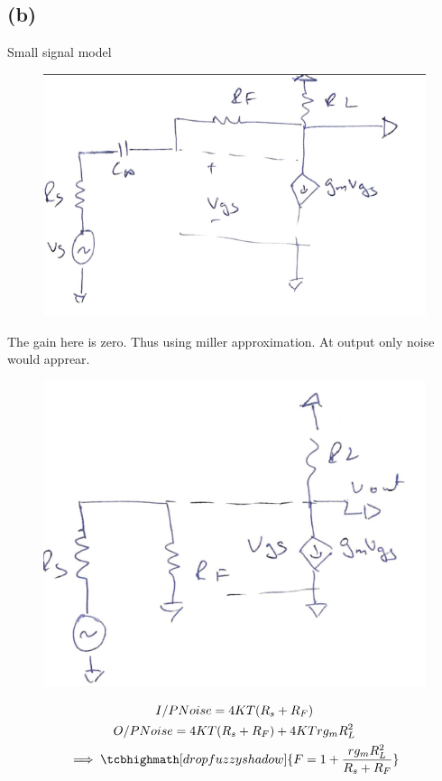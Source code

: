 \documentclass{article}
\begin{document}
\subsection*{(b)}
Small signal model
\begin{figure}[H]
	\centering
	\includegraphics[scale=0.4]{./figs/3c.png}
\end{figure}
The gain here is zero. Thus using miller approximation. At output only noise would apprear.
\begin{figure}[H]
	\centering
	\includegraphics[scale=0.4]{./figs/3d.png}
\end{figure}
\begin{gather*}
	I/PNoise = 4KT(R_s + R_F)\\
	O/PNoise = 4KT(R_s + R_F) + 4KTrg_mR_L^2\\
	\implies \tcbhighmath[drop fuzzy shadow]{F = 1 + \frac{rg_mR_L^2}{R_s + R_F}} 
\end{gather*}
\end{document}
